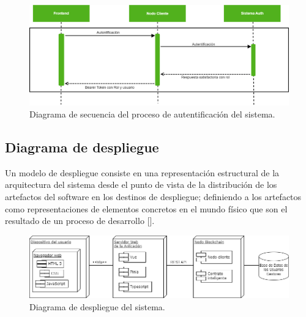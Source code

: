 \begin{figure}[!h]
\centering
\includegraphics[scale=0.3]{Graphics/autht}
\caption{Diagrama de secuencia del proceso de autentificación del sistema.}
\label{fig:autht}
\end{figure}

%

\subsection{Diagrama de despliegue}
Un modelo de despliegue consiste en una representación estructural de la arquitectura del sistema desde el punto de vista de la distribución de los artefactos del software en los destinos de despliegue; definiendo a los artefactos como representaciones de elementos concretos en el mundo físico que son el resultado de un proceso de desarrollo [\cite{91}]. 

\begin{figure}[htbp]
\centering
\includegraphics[scale=0.3]{Graphics/deploy}
\caption{Diagrama de despliegue del sistema.}
\label{fig:deploy}
\end{figure}


